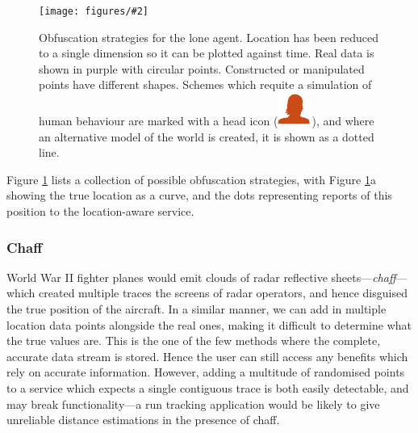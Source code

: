 \documentclass{IOS-Book-Article}     %
\newcommand{\fig}[3][0.9]{
\begin{figure}[tp]
\begin{center}
\texttt{[image: figures/\#2]}
\caption{#3}
\label{fig:#2}
\end{center}
\end{figure}
}
\begin{document}
\fig[0.91]{SinglePlayerObfuscation}{Obfuscation strategies for the lone agent.
Location has been reduced to a single dimension so it can be plotted against time.
Real data is shown in purple with circular points. Constructed or manipulated
points have different shapes. Schemes which requite a simulation of human
behaviour are marked with a head icon
(\includegraphics[height=7 pt]{figures/Head}), and where an alternative
model of the world is created, it is shown as a dotted line. 
}

Figure \ref{fig:SinglePlayerObfuscation} lists a collection of possible
obfuscation strategies, with Figure
\ref{fig:SinglePlayerObfuscation}a showing the true location as a curve, 
and the dots representing reports of this position to the location-aware service. 

\subsubsection{Chaff}

World War II fighter planes would emit clouds of radar reflective
sheets---\emph{chaff}---which created multiple traces the screens of radar
operators, and hence disguised the true position of the aircraft. In a similar
manner, we can add in multiple location data points alongside the real ones,
making it difficult to determine what the true values are.
This is the one of the few methods where the complete, accurate data stream is stored.
Hence the user can still access any benefits which rely on accurate information. However,
adding a multitude of randomised points to a service which expects a single
contiguous trace is both easily detectable, and may break functionality---a
run tracking application would be likely to give unreliable distance estimations
in the presence of chaff.
\end{document}
